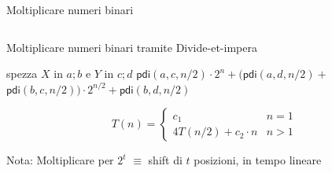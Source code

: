 \begin{frame}{Moltiplicare numeri binari}
\begin{myboxtitle}
\begin{columns}[c]
\begin{column}{0.46\textwidth}
\begin{center}
\end{center}
\end{column}
\end{columns}
\end{myboxtitle}


\end{frame}

\begin{frame}{Moltiplicare numeri binari tramite Divide-et-impera}
    
\vspace{-9pt}
\begin{Procedure}
\caption[A]{$\BOOLEAN[\,]\ \textsf{pdi}(\BOOLEAN[\,]\ X,\ \BOOLEAN[\,]\ Y,\ \INTEGER\ n)$}
{
  spezza $X$ in $a;b$ e $Y$ in $c;d$\;
  \Return $\textsf{pdi}(a,c, n/2)\cdot 2^n + (\textsf{pdi}(a,d, n/2)+$\; 
  \hspace{1.2cm} $\textsf{pdi}(b,c, n/2)) \cdot 2^{n/2} + \textsf{pdi}(b,d, n/2)$\;
}
\end{Procedure}
\[
T(n) = \left\{ 
  \begin{array}{ll}
     c_1 & n = 1\\
     4 T(n/2) + c_2 \cdot n & n > 1 
  \end{array} 
\right.
\]


\begin{mybox}
\alert{Nota}:
 Moltiplicare per $2^t$ $\equiv$ shift di $t$ posizioni, in tempo lineare
\end{mybox}

	
\end{frame}

